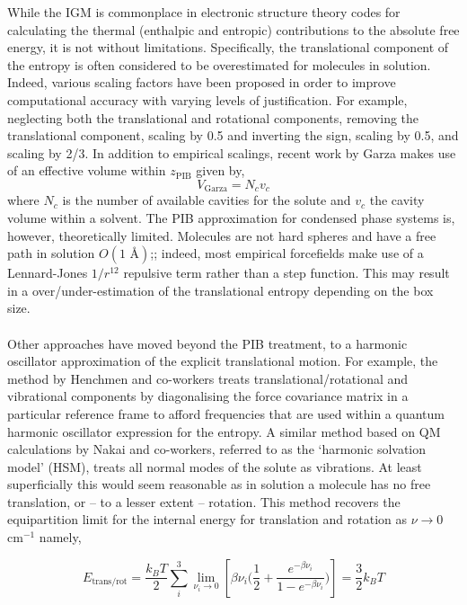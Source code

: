 \documentclass[../main.tex]{subfiles}
\begin{document}
While the IGM is commonplace in electronic structure theory codes for calculating the thermal (enthalpic and entropic) contributions to the absolute free energy, it is not without limitations. Specifically, the translational component of the entropy is often considered to be overestimated for molecules in solution.\cite{Gilson2010} Indeed, various scaling factors have been proposed in order to improve computational accuracy with varying levels of justification. For example, neglecting both the translational and rotational components,\cite{Sumimoto2004} removing the translational component,\cite{Tanaka2011} scaling by 0.5 and inverting the sign,\cite{Deubel2006} scaling by 0.5,\cite{Li2016} and scaling by 2/3.\cite{DiTommaso2010} In addition to empirical scalings, recent work by Garza\cite{Garza2019} makes use of an effective volume within $z_\text{PIB}$ given by,
\begin{equation}
V_\text{Garza} = N_c v_c
\end{equation}
where $N_c$ is the number of available cavities for the solute and $v_c$ the cavity volume within a solvent. The PIB approximation for condensed phase systems is, however, theoretically limited. Molecules are not hard spheres and have a free path in solution $O(1 \text{ \AA})$;\cite{Herman2016}; indeed, most empirical forcefields make use of a Lennard-Jones $1/r^{12}$ repulsive term rather than a step function. This may result in a over/under-estimation of the translational entropy depending on the box size.
\\\\
Other approaches have moved beyond the PIB treatment, to a harmonic oscillator approximation of the explicit translational motion. For example, the method by Henchmen and co-workers treats  translational/rotational and vibrational components by diagonalising the force covariance matrix in a particular reference frame to afford frequencies that are used within a quantum harmonic oscillator expression for the entropy.\cite{Chakravorty2020, Ali2019} A similar method based on QM calculations by Nakai and co-workers, referred to as the `harmonic solvation model' (HSM), treats all normal modes of the solute as vibrations.\cite{Nakai2014} At least superficially this would seem reasonable as in solution a molecule has no free translation, or -- to a lesser extent -- rotation. This method recovers the equipartition limit for the internal energy for translation and rotation as $\nu \rightarrow 0$ cm$^{-1}$ namely,

\begin{equation}
E_\text{trans/rot} = \frac{k_B T}{2} \sum_i^3 \lim\limits_{\nu_i \rightarrow 0} \left[ {\beta\nu_i} {\Big (} \frac{1}{2} + \frac{e^{-\beta\nu_i}}{1-e^{-\beta\nu_i}} {\Big )}\right] = \frac{3}{2} k_B T
\end{equation} 
\end{document}
